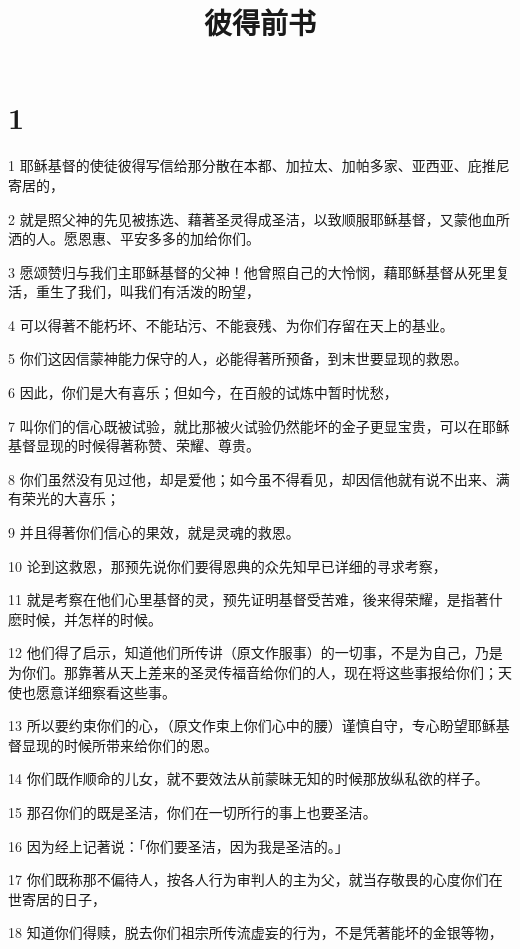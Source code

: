 

\title{彼得前书}


\chapter{1}

\par 1 耶稣基督的使徒彼得写信给那分散在本都、加拉太、加帕多家、亚西亚、庇推尼寄居的，
\par 2 就是照父神的先见被拣选、藉著圣灵得成圣洁，以致顺服耶稣基督，又蒙他血所洒的人。愿恩惠、平安多多的加给你们。
\par 3 愿颂赞归与我们主耶稣基督的父神！他曾照自己的大怜悯，藉耶稣基督从死里复活，重生了我们，叫我们有活泼的盼望，
\par 4 可以得著不能朽坏、不能玷污、不能衰残、为你们存留在天上的基业。
\par 5 你们这因信蒙神能力保守的人，必能得著所预备，到末世要显现的救恩。
\par 6 因此，你们是大有喜乐；但如今，在百般的试炼中暂时忧愁，
\par 7 叫你们的信心既被试验，就比那被火试验仍然能坏的金子更显宝贵，可以在耶稣基督显现的时候得著称赞、荣耀、尊贵。
\par 8 你们虽然没有见过他，却是爱他；如今虽不得看见，却因信他就有说不出来、满有荣光的大喜乐；
\par 9 并且得著你们信心的果效，就是灵魂的救恩。
\par 10 论到这救恩，那预先说你们要得恩典的众先知早已详细的寻求考察，
\par 11 就是考察在他们心里基督的灵，预先证明基督受苦难，後来得荣耀，是指著什麽时候，并怎样的时候。
\par 12 他们得了启示，知道他们所传讲（原文作服事）的一切事，不是为自己，乃是为你们。那靠著从天上差来的圣灵传福音给你们的人，现在将这些事报给你们；天使也愿意详细察看这些事。
\par 13 所以要约束你们的心，（原文作束上你们心中的腰）谨慎自守，专心盼望耶稣基督显现的时候所带来给你们的恩。
\par 14 你们既作顺命的儿女，就不要效法从前蒙昧无知的时候那放纵私欲的样子。
\par 15 那召你们的既是圣洁，你们在一切所行的事上也要圣洁。
\par 16 因为经上记著说：「你们要圣洁，因为我是圣洁的。」
\par 17 你们既称那不偏待人，按各人行为审判人的主为父，就当存敬畏的心度你们在世寄居的日子，
\par 18 知道你们得赎，脱去你们祖宗所传流虚妄的行为，不是凭著能坏的金银等物，
